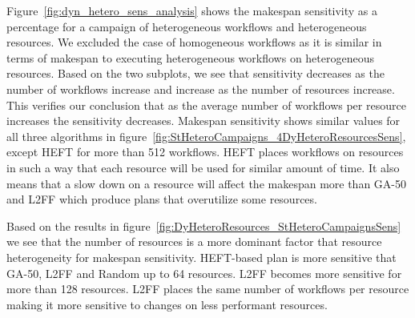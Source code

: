 Figure~\ref{fig:dyn_hetero_sens_analysis} shows the makespan sensitivity as a percentage for a campaign of heterogeneous workflows and heterogeneous resources.
We excluded the case of homogeneous workflows as it is similar in terms of makespan to executing heterogeneous workflows on heterogeneous resources.
Based on the two subplots, we see that sensitivity decreases as the number of workflows increase and increase as the number of resources increase.
This verifies our conclusion that as the average number of workflows per resource increases the sensitivity decreases.
Makespan sensitivity shows similar values for all three algorithms in figure~\ref{fig:StHeteroCampaigns_4DyHeteroResourcesSens}, except HEFT for more than 512 workflows.
HEFT places workflows on resources in such a way that each resource will be used for similar amount of time.
It also means that a slow down on a resource will affect the makespan more than GA-50 and L2FF which produce plans that overutilize some resources.

Based on the results in figure~\ref{fig:DyHeteroResources_StHeteroCampaignsSens} we see that the number of resources is a more dominant factor that resource heterogeneity for makespan sensitivity.
HEFT-based plan is more sensitive that GA-50, L2FF and Random up to 64 resources.
L2FF becomes more sensitive for more than 128 resources.
L2FF places the same number of workflows per resource making it more sensitive to changes on less performant resources.

